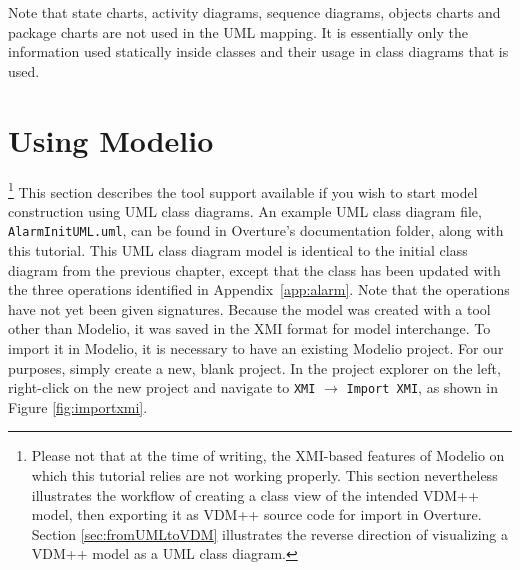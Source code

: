 
Note that state charts, activity diagrams, sequence diagrams, objects charts and package charts are not used in the UML mapping. It is essentially only the information used statically inside classes and their usage in class diagrams that is used.
%
\section{Using Modelio}\label{sec:Rose}
\footnote{Please not that at the time of writing, the XMI-based features of Modelio on which this tutorial relies are not working properly.  This section nevertheless illustrates the workflow of creating a class view of the intended VDM++ model, then exporting it as VDM++ source code for import in Overture.  Section \ref{sec:fromUMLtoVDM} illustrates the reverse direction of visualizing a VDM++ model as a UML class diagram.}
%
This section describes the tool support available if you wish to start model construction using UML class diagrams.  An example UML class diagram file, \texttt{AlarmInitUML.uml}, can be found in Overture's documentation folder, along with this tutorial.  This UML class diagram model is identical to the initial class diagram from the previous chapter, except that the  class has been updated with the three operations identified in Appendix~\ref{app:alarm}.
Note that the operations have not yet been given signatures.  Because the model was created with a tool other than Modelio, it was saved in the XMI format for model interchange.  To import it in Modelio, it is necessary to have an existing Modelio project.  For our purposes, simply create a new, blank project.  In the project explorer on the left, right-click on the new project and navigate to \texttt{XMI} $\rightarrow$ \texttt{Import XMI}, as shown in Figure \ref{fig:importxmi}.
%
